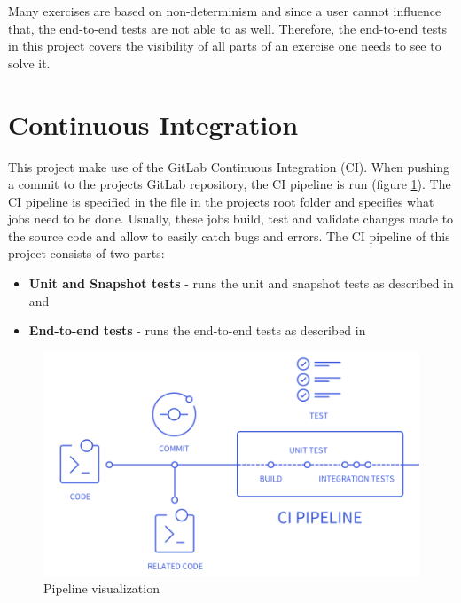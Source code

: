 Many exercises are based on non-determinism and since a user cannot influence that, the end-to-end tests are not able to as well. Therefore, the end-to-end tests in this project covers the visibility of all parts of an exercise one needs to see to solve it. 

\section{Continuous Integration}
\label{section:CI}

This project make use of the GitLab Continuous Integration (CI). When pushing a commit to the projects GitLab repository, the CI pipeline is run (figure \ref{fig:pipeline}). The CI pipeline is specified in the  file in the projects root folder and specifies what jobs need to be done. Usually, these jobs build, test and validate changes made to the source code and allow to easily catch bugs and errors.
The CI pipeline of this project consists of two parts:

\begin{itemize}
    \item \textbf{Unit and Snapshot tests} - runs the unit and snapshot tests as described in  and 
    \item \textbf{End-to-end tests} - runs the end-to-end tests as described in 
\end{itemize}

\begin{figure} 
    \centering
    \includegraphics[width=0.6 \columnwidth]{figures/pipeline.png}
    \caption{Pipeline visualization \cite{CIPipeline}} 
    \label{fig:pipeline} 
\end{figure}